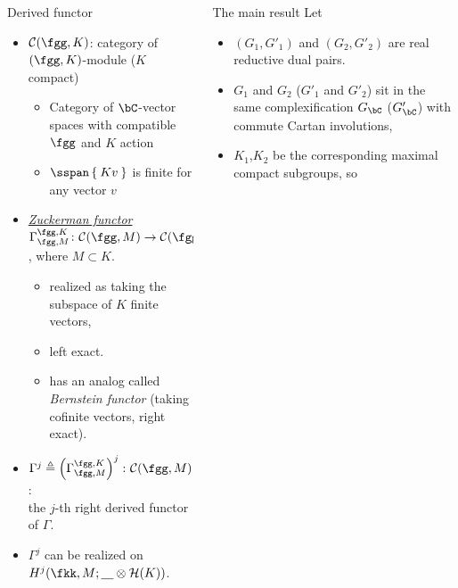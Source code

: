\documentclass[final,hyperref={pdfpagelabels=false}]{beamer} %
\def\emph#1{{\em \underline{#1}}}
\def\cC{\mathcal{C}}
\begin{document}
\begin{frame}
\begin{columns}[t]
\begin{column}{.48\linewidth}
\begin{block}{Derived functor}
  \begin{itemize}
     \item $\cC(\fgg,K)$: category of $(\fgg, K)$-module ($K$ compact)
      \begin{itemize}
      \item Category of $\bC$-vector spaces  with compatible $\fgg$ and $K$ action
      \item $\sspan\Set{Kv}$ is finite for any vector $v$  
      \end{itemize}
    \item \emph{Zuckerman functor}  $\Gamma_{\fgg,M}^{\fgg,K}
      \colon \cC(\fgg,M)\to \cC(\fgg,K)$, 
      where $M\subset K$.
      \begin{itemize}
      \item realized as taking the subspace of $K$ finite vectors,
      \item left exact.
      \item has an analog called {\em Bernstein functor} (taking cofinite vectors, right exact).
      \end{itemize}
    \item $\Gamma^j\triangleq\left(\Gamma_{\fgg,M}^{\fgg,K}\right)^j
      \colon \cC(\fgg,M)\to \cC(\fgg,K)$: \\
      the $j$-th right derived functor of $\Gamma$.
    \item $\Gamma^j$ can be realized on $H^j(\fkk,M; \underline{\hskip1em} \otimes \mathcal{H}(K))$.
    \end{itemize}
\end{block}
\end{column}
\begin{column}{.48\linewidth}
    \begin{block}{The main result}
      Let
      \begin{itemize}
      \item $(G_1,G'_1)$ and $(G_2,G'_2)$ are real reductive dual pairs.
      \item $G_1$ and $G_2$ ($G'_1$ and $G'_2$) sit in the same complexification $G_\bC$ ($G'_\bC$)
        with commute Cartan involutions,
      \item $K_1$,$K_2$ be the corresponding maximal compact subgroups, so

\end{itemize}
\end{block}
\end{column}
\end{columns}
\end{frame}
\end{document}

